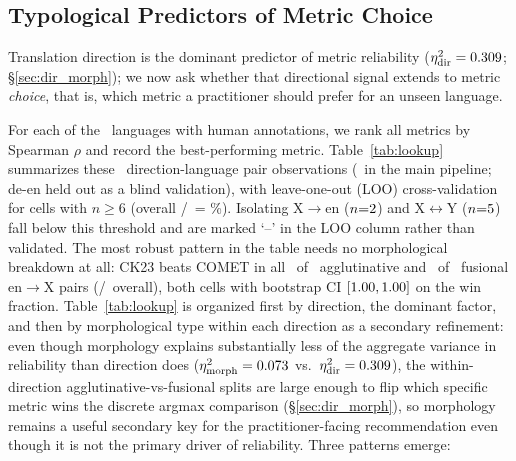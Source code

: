 \documentclass[11pt]{article}
\begin{document}
\subsection{Typological Predictors of Metric Choice}
\label{sec:predictor}

Translation direction is the dominant predictor of metric reliability ($\eta^2_{\text{dir}}=0.309$; \S\ref{sec:dir_morph}); we now ask whether that directional signal extends to metric \emph{choice}, that is, which metric a practitioner should prefer for an unseen language.

For each of the \NumHumanAnnotatedLanguages\ languages with human annotations, we rank all metrics by Spearman $\rho$ and record the best-performing metric.
Table~\ref{tab:lookup} summarizes these \TableFourTotalPairs\ direction-language pair observations (\TableFourMainPipelinePairs\ in the main pipeline; de-en held out as a blind validation), with leave-one-out (LOO) cross-validation for cells with $n \geq 6$ (overall \LOOOverallCorrect/\LOOOverallTotal\ = \LOOOverallPct\%). Isolating X$\to$en ($n{=}2$) and X$\leftrightarrow$Y ($n{=}5$) fall below this threshold and are marked `--' in the LOO column rather than validated.
The most robust pattern in the table needs no morphological breakdown at all: CK23 beats COMET in all \BeatsCometEntoXAgglutin\ of \WinTotalEntoXAgglutin\ agglutinative and \BeatsCometEntoXFusional\ of \WinTotalEntoXFusional\ fusional en$\to$X pairs (\BeatsCometEntoXTotal/\EntoXTotalPairs\ overall), both cells with bootstrap CI $[1.00, 1.00]$ on the win fraction. Table~\ref{tab:lookup} is organized first by direction, the dominant factor, and then by morphological type within each direction as a secondary refinement: even though morphology explains substantially less of the aggregate variance in reliability than direction does ($\eta^2_{\text{morph}}=0.073$ vs.\ $\eta^2_{\text{dir}}=0.309$), the within-direction agglutinative-vs-fusional splits are large enough to flip which specific metric wins the discrete argmax comparison (\S\ref{sec:dir_morph}), so morphology remains a useful secondary key for the practitioner-facing recommendation even though it is not the primary driver of reliability.
Three patterns emerge:
\end{document}
